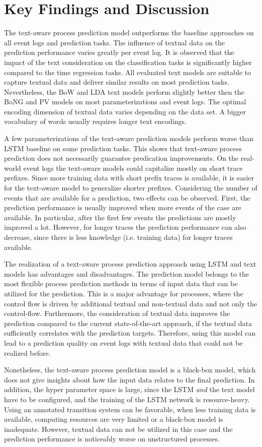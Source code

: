 \section{Key Findings and Discussion}

The text-aware process prediction model outperforms the baseline approaches on all event logs and prediction tasks.
The influence of textual data on the prediction performance varies greatly per event log.
It is observed that the impact of the text consideration on the classification tasks is significantly higher compared to the time regression tasks.
All evaluated text models are suitable to capture textual data and deliver similar results on most prediction tasks.
Nevertheless, the BoW and LDA text models perform slightly better then the BoNG and PV models on most parameterizations and event logs.
The optimal encoding dimension of textual data varies depending on the data set.
A bigger vocabulary of words usually requires longer text encodings.

A few parameterizations of the text-aware prediction models perform worse than LSTM baseline on some prediction tasks.
This shows that text-aware process prediction does not necessarily guarantee predication improvements.
On the real-world event logs the text-aware models could capitalize mostly on short trace prefixes.
Since more training data with short prefix traces is available, it is easier for the text-aware model to generalize shorter prefixes.
Considering the number of events that are available for a prediction, two effects can be observed.
First, the prediction performance is usually improved when more events of the case are available.
In particular, after the first few events the predictions are mostly improved a lot.
However, for longer traces the prediction performance can also decrease, since there is less knowledge (i.e. training data) for longer traces available.

The realization of a text-aware process prediction approach using LSTM and text models has advantages and disadvantages.
The prediction model belongs to the most flexible process prediction methods in terms of input data that can be utilized for the prediction.
This is a major advantage for processes, where the control flow is driven by additional textual and non-textual data and not only the control-flow.
Furthermore, the consideration of textual data improves the prediction compared to the current state-of-the-art approach, if the textual data sufficiently correlates with the prediction targets.
Therefore, using this model can lead to a prediction quality on event logs with textual data that could not be realized before.

Nonetheless, the text-aware process prediction model is a black-box model, which does not give insights about how the input data relates to the final prediction.
In addition, the hyper parameter space is large, since the LSTM \textit{and} the text model have to be configured, and the training of the LSTM network is resource-heavy.
Using an annotated transition system can be favorable, when less training data is available, computing resources are very limited or a black-box model is inadequate.
However, textual data can not be utilized in this case and the prediction performance is noticeably worse on unstructured processes.